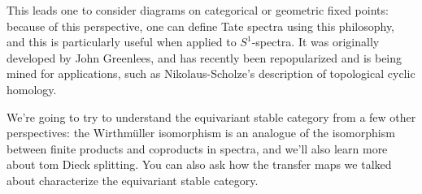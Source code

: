 This leads one to consider diagrams on categorical or geometric fixed points: because of this perspective, one can
define Tate spectra using this philosophy, and this is particularly useful when applied to $S^1$-spectra. It was
originally developed by John Greenlees, and has recently been repopularized and is being mined for applications,
such as Nikolaus-Scholze's description of topological cyclic homology.

We're going to try to understand the equivariant stable category from a few other perspectives: the Wirthmüller
isomorphism is an analogue of the isomorphism between finite products and coproducts in spectra, and we'll also
learn more about tom Dieck splitting. You can also ask how the transfer maps we talked about
characterize the equivariant stable category.
